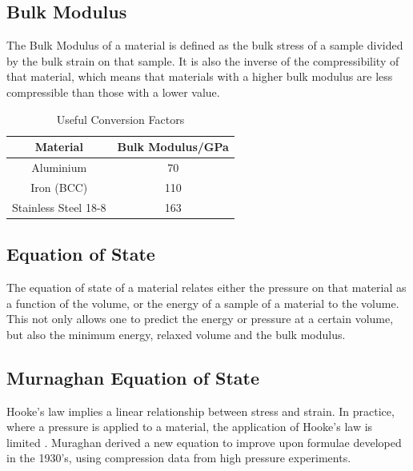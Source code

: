 \subsection{Bulk Modulus}

The Bulk Modulus of a material is defined as the bulk stress of a sample divided by the bulk strain on that sample.  It is also the inverse of the compressibility of that material, which means that materials with a higher bulk modulus are less compressible than those with a lower value.

\eqBulkModulusA

\eqBulkModulusB



\begin{table}[h]
\caption{Useful Conversion Factors}
\begin{center}
\begin{tabular}{c c}
Material & Bulk Modulus/GPa \\
\hline\hline
Aluminium & 70 \\
Iron (BCC) & 110 \\
Stainless Steel 18-8 & 163 \\
\end{tabular}
\end{center}
\end{table}



\subsection{Equation of State}

The equation of state of a material relates either the pressure on that material as a function of the volume, or the energy of a sample of a material to the volume.  This not only allows one to predict the energy or pressure at a certain volume, but also the minimum energy, relaxed volume and the bulk modulus.



\subsection{Murnaghan Equation of State}

Hooke's law implies a linear relationship between stress and strain.  In practice, where a pressure is applied to a material, the application of Hooke's law is limited \cite{murnaghaneq}.  Muraghan derived a new equation to improve upon formulae developed in the 1930's, using compression data from high pressure experiments.

